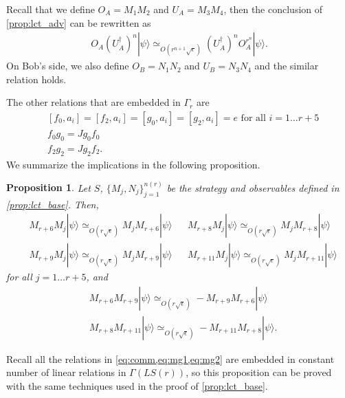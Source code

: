 \documentclass[11pt,letterpaper]{article}
\newcommand{\ket}[1]{|#1\rangle}
\newcommand{\ct}{^{\dagger}}
\newcommand{\1}{\mathbb{1}}
\newcommand{\LS}{LS}
\newcommand{\nr}{n(r)}
\newcommand{\se}{\sqrt{\epsilon}}
\newcommand{\appd}[1]{\simeq_{#1}}
\newtheorem{proposition}[theorem]{Proposition}
\theoremstyle{definition}
\begin{document}

Recall that we define $O_A = M_1M_2$ and $U_A=M_3M_4$, then
the conclusion of \cref{prop:lct_adv} can be rewritten as 
\begin{align*}
	 O_A (U_A\ct)^n \ket{\psi} \appd{O(r^{n+1} \se)} (U_A\ct)^n O_A^{r^n} \ket{\psi}.
\end{align*}
On Bob's side, we also define $O_B = N_1N_2$ and $U_B = N_3N_4$ 
and the similar relation holds.

The other relations that are embedded in $\Gamma_r$ are 
\begin{align}
	\label{eq:comm}&[f_0, a_i] = [f_2, a_i] = [g_0, a_i] = [g_2, a_i] = e \text{ for all } i = 1 \dots r+5 \\
	\label{eq:mg1}&f_0g_0 = Jg_0f_0 \\
	\label{eq:mg2}&f_2g_2 = J g_2 f_2.
\end{align}
We summarize the implications in the following proposition.
\begin{proposition}
	\label{prop:lct_comm}
	Let $S$, $\{M_j, N_j\}_{j=1}^{\nr}$ be the strategy and observables defined in \cref{prop:lct_base}.
	Then,
	\begin{align}
		&M_{r+6} M_j \ket{\psi} \appd{O(r\se)} M_j M_{r+6} \ket{\psi} && 
		M_{r+8}M_j \ket{\psi} \appd{O(r\se)} M_j M_{r+8} \ket{\psi} \\
		&M_{r+9} M_j \ket{\psi} \appd{O(r\se)} M_j M_{r+9} \ket{\psi} && 
		M_{r+11}M_j \ket{\psi} \appd{O(r\se)} M_j M_{r+11} \ket{\psi} 
	\end{align}
	for all $j = 1 \dots r+5$, and
	\begin{align}
		&M_{r+6}M_{r+9} \ket{\psi} \appd{O(r\se)} -M_{r+9}M_{r+6} \ket{\psi} \\
		&M_{r+8}M_{r+11} \ket{\psi} \appd{O(r\se)} -M_{r+11}M_{r+8} \ket{\psi}.
	\end{align}
\end{proposition}
Recall all the relations in \cref{eq:comm,eq:mg1,eq:mg2} are embedded in constant number of linear relations in $\Gamma(\LS(r))$,
so this proposition can be proved with the same techniques used in the proof of \cref{prop:lct_base}.
\end{document}
